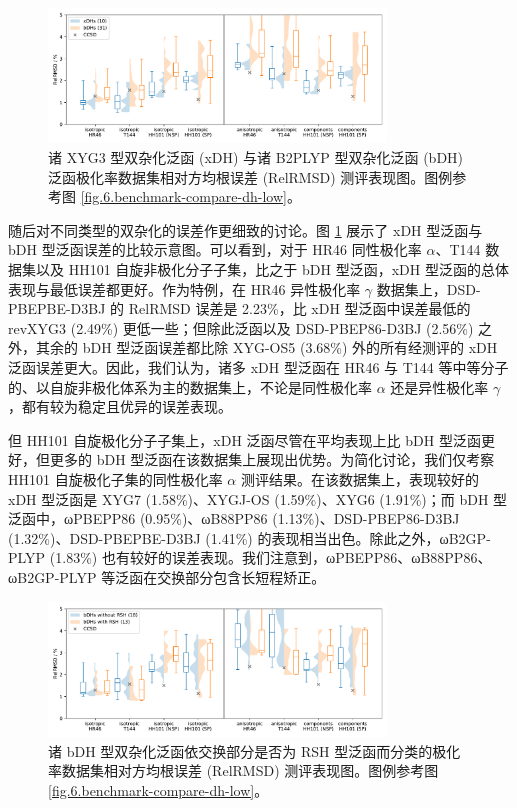 \begin{figure}[hp]
    \centering
    \includegraphics[width=0.8\textwidth]{assets/benchmark-compare-xdh-bdh.pdf}
    \caption[xDH 与 bDH 极化率 RelRMSD 测评表现与对比图]{诸 XYG3 型双杂化泛函 (xDH) 与诸 B2PLYP 型双杂化泛函 (bDH) 泛函极化率数据集相对方均根误差 (RelRMSD) 测评表现图。图例参考图 \ref{fig.6.benchmark-compare-dh-low}。}
    \label{fig.6.benchmark-compare-xdh-bdh}
\end{figure}

随后对不同类型的双杂化的误差作更细致的讨论。图 \ref{fig.6.benchmark-compare-xdh-bdh} 展示了 xDH 型泛函与 bDH 型泛函误差的比较示意图。可以看到，对于 HR46 同性极化率 $\alpha$、T144 数据集以及 HH101 自旋非极化分子子集，比之于 bDH 型泛函，xDH 型泛函的总体表现与最低误差都更好。作为特例，在 HR46 异性极化率 $\gamma$ 数据集上，DSD-PBEPBE-D3BJ 的 RelRMSD 误差是 2.23\%，比 xDH 型泛函中误差最低的 revXYG3 (2.49\%) 更低一些；但除此泛函以及 DSD-PBEP86-D3BJ (2.56\%) 之外，其余的 bDH 型泛函误差都比除 XYG-OS5 (3.68\%) 外的所有经测评的 xDH 泛函误差更大。因此，我们认为，诸多 xDH 型泛函在 HR46 与 T144 等中等分子的、以自旋非极化体系为主的数据集上，不论是同性极化率 $\alpha$ 还是异性极化率 $\gamma$，都有较为稳定且优异的误差表现。

但 HH101 自旋极化分子子集上，xDH 泛函尽管在平均表现上比 bDH 型泛函更好，但更多的 bDH 型泛函在该数据集上展现出优势。为简化讨论，我们仅考察 HH101 自旋极化子集的同性极化率 $\alpha$ 测评结果。在该数据集上，表现较好的 xDH 型泛函是 XYG7 (1.58\%)、XYGJ-OS (1.59\%)、XYG6 (1.91\%)；而 bDH 型泛函中，ωPBEPP86 (0.95\%)、ωB88PP86 (1.13\%)、DSD-PBEP86-D3BJ (1.32\%)、DSD-PBEPBE-D3BJ (1.41\%) 的表现相当出色。除此之外，ωB2GP-PLYP (1.83\%) 也有较好的误差表现。我们注意到，ωPBEPP86、ωB88PP86、ωB2GP-PLYP 等泛函在交换部分包含长短程矫正。

\begin{figure}[hp]
    \centering
    \includegraphics[width=0.8\textwidth]{assets/benchmark-compare-dh-rsh.pdf}
    \caption[bDH 依 RSH 分类的极化率 RelRMSD 测评表现图]{诸 bDH 型双杂化泛函依交换部分是否为 RSH 型泛函而分类的极化率数据集相对方均根误差 (RelRMSD) 测评表现图。图例参考图 \ref{fig.6.benchmark-compare-dh-low}。}
    \label{fig.6.benchmark-compare-dh-rsh}
\end{figure}

